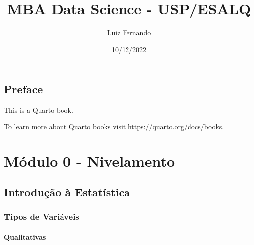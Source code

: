 \documentclass[
  letterpaper,
  DIV=11,
  numbers=noendperiod]{scrreprt}
\title{MBA Data Science - USP/ESALQ}
\author{Luiz Fernando}
\date{10/12/2022}
\renewcommand*\contentsname{Table of contents}
\newcommand\contentsname{Table of contents}
\begin{document}
\maketitle
\ifdefined\Shaded\renewenvironment{Shaded}{\begin{tcolorbox}[breakable, boxrule=0pt, interior hidden, enhanced, sharp corners, borderline west={3pt}{0pt}{shadecolor}, frame hidden]}{\end{tcolorbox}}\fi

\renewcommand*\contentsname{Table of contents}
{
\hypersetup{linkcolor=}
\setcounter{tocdepth}{2}
\tableofcontents
}

\hypertarget{preface}{%
\chapter*{Preface}\label{preface}}

This is a Quarto book.

To learn more about Quarto books visit
\url{https://quarto.org/docs/books}.

\part{Módulo 0 - Nivelamento}

\hypertarget{introduuxe7uxe3o-uxe0-estatuxedstica}{%
\chapter{Introdução à
Estatística}\label{introduuxe7uxe3o-uxe0-estatuxedstica}}

\hypertarget{tipos-de-variuxe1veis}{%
\section{Tipos de Variáveis}\label{tipos-de-variuxe1veis}}

\hypertarget{qualitativas}{%
\subsection{Qualitativas}\label{qualitativas}}
\end{document}
